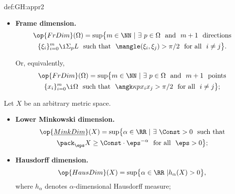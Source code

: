 {\begin{subthm}{def:GH:appr2}
\begin{itemize}
\item\label{F-dim} \textbf{Frame dimension.}
\begin{multline*}\op{FrDim}(\Omega)=\sup\bigl\{m\in\NN\ |\ \exists\ p\in\Omega\ \ \text{and}\ \ m+1\ \ \text{directions}\\ 
\{\xi_i\}_{i=0}^m\i\Sigma_pL\ \  
\text{such that}\ \ \mangle(\xi_i,\xi_j)>\pi/2\ \ \text{for all}\ \  i\not=j\bigr\}.
\end{multline*}

Or, equivalently,
\begin{multline*}\op{FrDim}(\Omega)=\sup\bigl\{m\in\NN\ |\ \exists\ p\in\Omega\ \ \text{and}\ \ m+1\ \ \text{points}\\ 
\{x_i\}_{i=0}^m\i \Omega\ \  
\text{such that}\ \ \angk\kappa p{x_i}{x_j}>\pi/2\ \ \text{for all}\ \  i\not=j\bigr\};
\end{multline*}

\end{itemize}




 Let $X$ be an arbitrary metric space.
\begin{itemize}
\item \textbf{Lower Minkowski dimension.}
\begin{multline*}
\op{\underline{MinkDim}}(X)=\sup\bigl\{\alpha\in\RR\ |\ \exists\ \Const>0\ \  \text{such that}\\ 
\pack_\eps X\ge\Const\cdot\eps^{-\alpha}\ \ \text{for all}\ \ \eps>0\bigr\};
\end{multline*}
\item \textbf{Hausdorff dimension.}
\[\op{HausDim}(X)=\sup\bigl\{\alpha\in\RR\ | h_\alpha(X)>0\bigr\},\]
 where $h_\alpha$ denotes $\alpha$-dimensional Hausdorff measure;
\end{itemize}





\end{subthm}}
